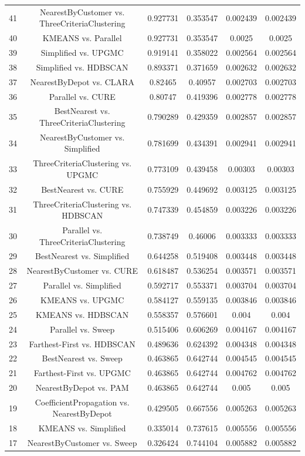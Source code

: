 \documentclass[a4paper,10pt]{article}
\begin{document}
\begin{landscape}
\begin{table}[!htp]
\begin{tabular}{cccccc}
41&NearestByCustomer vs. ThreeCriteriaClustering&0.927731&0.353547&0.002439&0.002439\\
40&KMEANS vs. Parallel&0.927731&0.353547&0.0025&0.0025\\
39&Simplified vs. UPGMC&0.919141&0.358022&0.002564&0.002564\\
38&Simplified vs. HDBSCAN&0.893371&0.371659&0.002632&0.002632\\
37&NearestByDepot vs. CLARA&0.82465&0.40957&0.002703&0.002703\\
36&Parallel vs. CURE&0.80747&0.419396&0.002778&0.002778\\
35&BestNearest vs. ThreeCriteriaClustering&0.790289&0.429359&0.002857&0.002857\\
34&NearestByCustomer vs. Simplified&0.781699&0.434391&0.002941&0.002941\\
33&ThreeCriteriaClustering vs. UPGMC&0.773109&0.439458&0.00303&0.00303\\
32&BestNearest vs. CURE&0.755929&0.449692&0.003125&0.003125\\
31&ThreeCriteriaClustering vs. HDBSCAN&0.747339&0.454859&0.003226&0.003226\\
30&Parallel vs. ThreeCriteriaClustering&0.738749&0.46006&0.003333&0.003333\\
29&BestNearest vs. Simplified&0.644258&0.519408&0.003448&0.003448\\
28&NearestByCustomer vs. CURE&0.618487&0.536254&0.003571&0.003571\\
27&Parallel vs. Simplified&0.592717&0.553371&0.003704&0.003704\\
26&KMEANS vs. UPGMC&0.584127&0.559135&0.003846&0.003846\\
25&KMEANS vs. HDBSCAN&0.558357&0.576601&0.004&0.004\\
24&Parallel vs. Sweep&0.515406&0.606269&0.004167&0.004167\\
23&Farthest-First vs. HDBSCAN&0.489636&0.624392&0.004348&0.004348\\
22&BestNearest vs. Sweep&0.463865&0.642744&0.004545&0.004545\\
21&Farthest-First vs. UPGMC&0.463865&0.642744&0.004762&0.004762\\
20&NearestByDepot vs. PAM&0.463865&0.642744&0.005&0.005\\
19&CoefficientPropagation vs. NearestByDepot&0.429505&0.667556&0.005263&0.005263\\
18&KMEANS vs. Simplified&0.335014&0.737615&0.005556&0.005556\\
17&NearestByCustomer vs. Sweep&0.326424&0.744104&0.005882&0.005882\\

\end{tabular}
\end{table}
\end{landscape}
\end{document}
